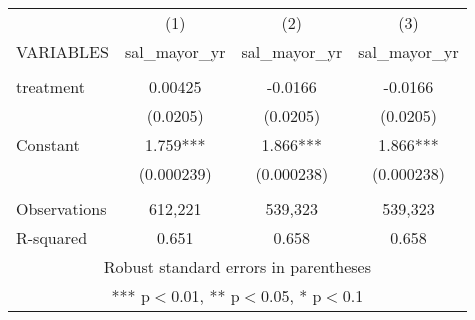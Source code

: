 \documentclass[]{article}
\begin{document}
\begin{tabular}{lccc} \hline
 & (1) & (2) & (3) \\
VARIABLES & sal\_mayor\_yr & sal\_mayor\_yr & sal\_mayor\_yr \\ \hline
 &  &  &  \\
treatment & 0.00425 & -0.0166 & -0.0166 \\
 & (0.0205) & (0.0205) & (0.0205) \\
Constant & 1.759*** & 1.866*** & 1.866*** \\
 & (0.000239) & (0.000238) & (0.000238) \\
 &  &  &  \\
Observations & 612,221 & 539,323 & 539,323 \\
 R-squared & 0.651 & 0.658 & 0.658 \\ \hline
\multicolumn{4}{c}{ Robust standard errors in parentheses} \\
\multicolumn{4}{c}{ *** p$<$0.01, ** p$<$0.05, * p$<$0.1} \\
\end{tabular}
\end{document}
